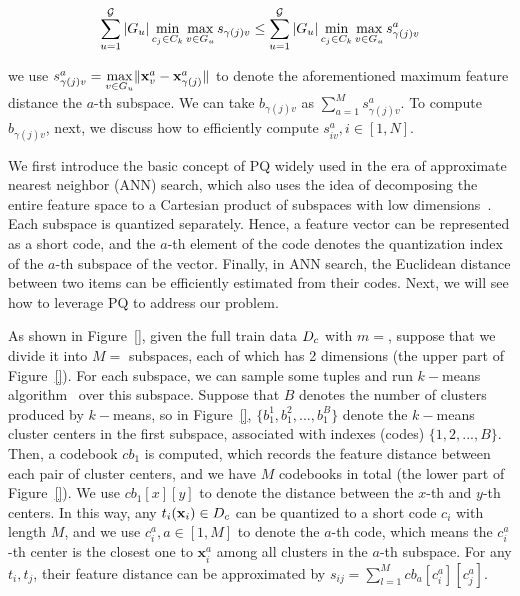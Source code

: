 \begin{equation}\label{eqa:cluster-5}
    \begin{aligned}
    \sum_{u=1}^{\mathcal{G}} |G_u| \min_{c_j\in C_k} \max_{v \in G_u} s_{\gamma(j)v} \leq\sum_{u=1}^{\mathcal{G}} |G_u| \min_{c_j\in C_k} \max_{v \in G_u} s^a_{\gamma(j)v}
    \end{aligned}
\end{equation}

\noindent we use $s^a_{\gamma(j)v} = \max\limits_{v \in G_u}\lVert \mathbf{x}^a_v - \mathbf{x}^a_{\gamma(j)}\rVert$ to denote the aforementioned maximum feature distance \wrt the $a$-th subspace. We can take $b_{\gamma(j)v}$ as $\sum_{a=1}^{M} s^a_{\gamma(j)v}$. To compute $b_{\gamma(j)v}$, next, we  discuss how to efficiently compute  $s^a_{iv}, i\in [1,N]$.

We first  introduce the basic concept of PQ widely used in the era of approximate nearest neighbor (ANN) search, which also uses the idea of  decomposing the entire feature space to a Cartesian product of subspaces with low dimensions~\cite{}. Each subspace is quantized separately. Hence, a feature vector can be represented as a short code, and the $a$-th element of the code denotes the  quantization index of the $a$-th subspace of the vector. Finally, in ANN search,  the Euclidean distance between two items can be efficiently estimated from their codes. Next, we will see how to leverage PQ to address our problem.

As shown  in Figure~\ref{}, given the full train data $D_c$ with $m=$, suppose that we divide it into $M=$ subspaces, each of which has 2 dimensions (the upper part of Figure~\ref{}).  For each subspace, we can sample some tuples and run $k-$means algorithm~\cite{} over this subspace. Suppose that $B$ denotes the number of clusters produced by $k-$means, so in Figure~\ref{}, $\{b_1^1, b_1^2,..., b_1^B\}$ denote the $k-$means cluster centers in the first subspace, associated with indexes (codes) $\{1, 2,...,B\}$. Then, a codebook $cb_1$ is computed, which records the feature distance between each pair of cluster centers, and we have $M$ codebooks in total (the lower part of Figure~\ref{}). We use $cb_1[x][y]$ to denote the distance between the $x$-th and $y$-th centers. In this way, any $t_i (\mathbf{x}_i) \in D_c$ can be quantized to a short code $c_i$ with length $M$, and we use $c_i^a, a\in[1,M]$  to denote the $a$-th code, which means the $c_i^a$-th center is the closest one to $\mathbf{x}_i^a$ among all clusters in the $a$-th subspace. For any $t_i, t_j$, their feature distance can be approximated by $s_{ij}=\sum_{l=1}^{M}cb_a[c_i^a][c_j^a]$.

